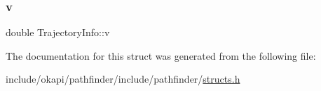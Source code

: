 \subsubsection{\texorpdfstring{v}{v}}
{\footnotesize\ttfamily double Trajectory\+Info\+::v}



The documentation for this struct was generated from the following file\+:\begin{DoxyCompactItemize}
\item 
include/okapi/pathfinder/include/pathfinder/\mbox{\hyperlink{structs_8h}{structs.\+h}}\end{DoxyCompactItemize}
